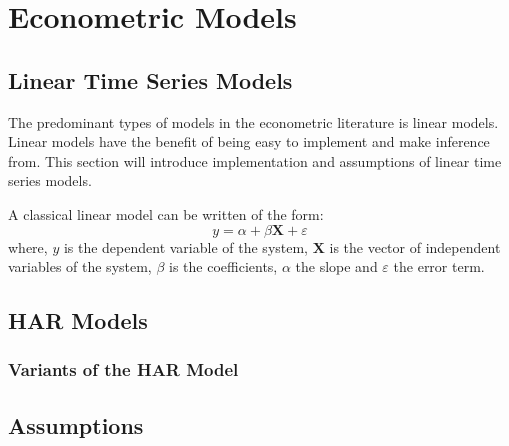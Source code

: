 \chapter{Econometric Models}
\label{sec:orga4fdf75}

\section{Linear Time Series Models}
\label{sec:orgd6b7089}
The predominant types of models in the econometric literature is linear models.
Linear models have the benefit of being easy to implement and make inference from.
This section will introduce implementation and assumptions of linear time series models.

A classical linear model can be written of the form:
\begin{equation}
    y = \alpha + \beta \mathbf{X} + \varepsilon
\end{equation}
where, $y$ is the dependent variable of the system, $\mathbf{X}$ is the vector of independent variables of the system, $\beta$ is the coefficients, $\alpha$ the slope and $\varepsilon$ the error term.


\section{HAR Models}
\label{sec:org9b8c0b5}

\subsection{Variants of the HAR Model}
\label{sec:orgka0i1f3}

\section{Assumptions}
\label{sec:org360241f}
